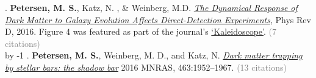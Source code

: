 \the\TotalPublications.   {\bf \textcolor{blueshade}{Petersen, M. S.}}, Katz, N. , \& Weinberg, M.D. \href{http://adsabs.harvard.edu/abs/2016PhRvD..94l3013P}{{\it The Dynamical Response of Dark Matter to Galaxy Evolution Affects Direct-Detection Experiments}}, Phys Rev D, 2016. Figure 4 was featured as part of the journal's \href{https://journals.aps.org/prd/kaleidoscope/prd/94/12/123013}{`Kaleidoscope'}. \ifcitationnumbers \textcolor{grey}{(7 citations)} \fi\\
\advance\TotalPublications by -1\relax
\the\TotalPublications.   {\bf \textcolor{blueshade}{Petersen, M. S.}}, Weinberg, M. D., and Katz, N. \href{http://adsabs.harvard.edu/abs/2016MNRAS.463.1952P}{\it Dark matter trapping by stellar bars: the shadow bar} 2016 MNRAS, 463:1952–1967. \ifcitationnumbers \textcolor{grey}{(13 citations)} \fi\\


